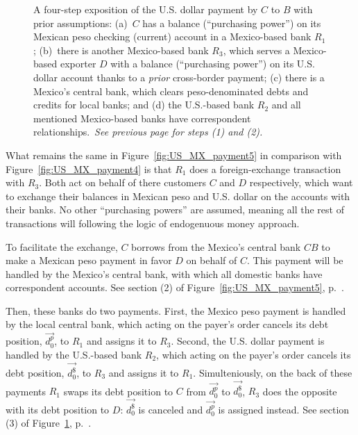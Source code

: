 \begin{figure}[!ht]
\caption[A four-step exposition of the U.S. dollar payment by $C$ to $B$, steps 3 and 4]%
{A four-step exposition of the U.S. dollar payment by $C$ to $B$ with prior assumptions: (a)~$C$ has a balance (``purchasing power'') on its Mexican peso checking (current) account in a Mexico-based bank $R_1$; (b)~there is another Mexico-based bank $R_3$, which serves a Mexico-based exporter $D$ with a balance (``purchasing power'') on its U.S. dollar account thanks to a \textit{prior} cross-border payment; (c) there is a Mexico's central bank, which clears peso-denominated debts and credits for local banks; and (d) the U.S.-based bank $R_2$ and all mentioned Mexico-based banks have correspondent relationships.~\textit{See previous page for steps (1) and (2).}}%
\label{fig:US_MX_payment5_}
\end{figure}

What remains the same in Figure~\ref{fig:US_MX_payment5} in comparison with Figure~\ref{fig:US_MX_payment4} is that $R_1$ does a foreign-exchange transaction with $R_3$. Both act on behalf of there customers $C$ and $D$ respectively, which want to exchange their balances in Mexican peso and U.S. dollar on the accounts with their banks. No other ``purchasing powers'' are assumed, meaning all the rest of transactions will following the logic of endogenuous money approach.

To facilitate the exchange, $C$ borrows from the Mexico's central bank $CB$ to make a Mexican peso payment in favor $D$ on behalf of $C$. This payment will be handled by the Mexico's central bank, with which all domestic banks have correspondent accounts. See section (2) of Figure~\ref{fig:US_MX_payment5}, p.~\pageref{fig:US_MX_payment5}.

Then, these banks do two payments. First, the Mexico peso payment is handled by the local central bank, which acting on the payer's order cancels its debt position, $\overrightarrow{d^{p}_{0}}$, to $R_1$ and assigns it to $R_3$. Second, the U.S. dollar payment is handled by the U.S.-based bank $R_2$, which acting on the payer's order cancels its debt position, $\overrightarrow{d^{\$}_{0}}$, to $R_3$ and assigns it to $R_1$. Simulteniously, on the back of these payments $R_1$ swaps its debt position to $C$ from $\overrightarrow{d^{p}_{0}}$ to $\overrightarrow{d^{\$}_{0}}$, $R_3$ does the opposite with its debt position to $D$: $\overrightarrow{d^{\$}_{0}}$ is canceled and $\overrightarrow{d^{p}_{0}}$ is assigned instead. See section (3) of Figure~\ref{fig:US_MX_payment5_}, p.~\pageref{fig:US_MX_payment5_}.

